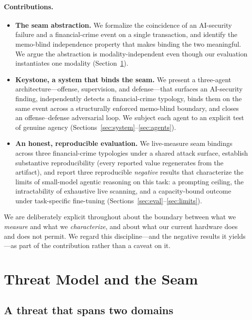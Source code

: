 \documentclass[10pt,twocolumn]{article}
\begin{document}
\paragraph{Contributions.}
\begin{itemize}
\item \textbf{The seam abstraction.} We formalize the coincidence of an
AI-security failure and a financial-crime event on a single transaction, and
identify the memo-blind independence property that makes binding the two
meaningful. We argue the abstraction is modality-independent even though our
evaluation instantiates one modality (Section~\ref{sec:threat}).

\item \textbf{Keystone, a system that binds the seam.} We present a three-agent
architecture---offense, supervision, and defense---that surfaces an AI-security
finding, independently detects a financial-crime typology, binds them on the
same event across a structurally enforced memo-blind boundary, and closes an
offense--defense adversarial loop. We subject each agent to an explicit test of
genuine agency (Sections~\ref{sec:system}--\ref{sec:agents}).

\item \textbf{An honest, reproducible evaluation.} We live-measure seam bindings
across three financial-crime typologies under a shared attack surface, establish
substantive reproducibility (every reported value regenerates from the
artifact), and report three reproducible \emph{negative} results that
characterize the limits of small-model agentic reasoning on this task: a
prompting ceiling, the intractability of exhaustive live scanning, and a
capacity-bound outcome under task-specific fine-tuning (Sections~\ref{sec:eval}--\ref{sec:limits}).
\end{itemize}

We are deliberately explicit throughout about the boundary between what we
\emph{measure} and what we \emph{characterize}, and about what our current
hardware does and does not permit. We regard this discipline---and the negative
results it yields---as part of the contribution rather than a caveat on it.




\section{Threat Model and the Seam}\label{sec:threat}

\subsection{A threat that spans two domains}
\end{document}

